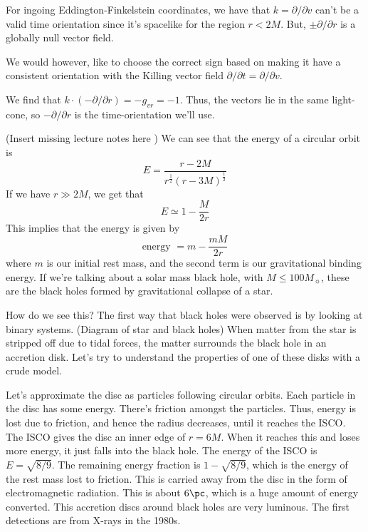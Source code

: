 \documentclass[11pt, oneside]{article}   	%
\theoremstyle{slanted}
\begin{document}
For ingoing Eddington-Finkelstein coordinates, 
we have that $ k  = \partial  / \partial v  $  	 
can't be a valid time orientation 
since it's spacelike for the 
region $ r < 2M $. 
But, $ \pm \partial  / \partial  r $ is a 
globally null vector field. 

We would however, like to 
choose the correct sign based on 
making it have a consistent orientation 
with the Killing vector field $ \partial  / \partial  t  = 
\partial   / \partial  v $. 

We find that $ k \cdot  \left(   - \partial  / \partial  r  \right)   = 
- g_{ vr }  = -1 $. Thus, 
the vectors lie 
in the same light-cone, so $  - \partial   / \partial  r $ 
is the time-orientation we'll use. 

(Insert missing lecture notes here )
We can see that the energy of a 
circular orbit is 
\[
E  = \frac{ r -  2M }{ r ^{ \frac{1}{2 }} \left( r - 3M  \right)  ^{ \frac{1}{2 } } } 
\] If we have  
$ r \gg 2M $, we get that 
\[
E \simeq 1 - \frac{M}{2 r } 
\] This implies that 
the energy is given by 
\[
\text{energy }  = m  - \frac{ m M }{ 2 r}  
\] where $ m $ is our initial rest mass, 
and the second term is our 
gravitational binding energy. 
If we're talking about a 
solar mass black hole, with $ M \leq 100 M_{ \sun} $, 
these are the black holes 
formed by gravitational collapse of a star. 

How do we see this? 
The first way that black holes 
were observed is by looking at 
binary systems. 
(Diagram of star and black holes)
When matter from the star is stripped 
off due to tidal forces, the 
matter surrounds the black hole 
in an accretion disk. 
Let's try to understand the properties of one of 
these disks with a crude model. 

Let's approximate the disc as particles following circular orbits. 
Each particle in the disc has some energy. 
There's friction 
amongst the particles. Thus, energy is lost 
due to friction, and hence the radius 
decreases, until 
it reaches the ISCO.
The ISCO gives the disc an 
inner edge of $ r = 6M $. 
When it reaches this and loses more energy, it 
just falls into the black hole. 
The energy of the ISCO is $ E  = \sqrt{ 8 / 9 }   $. 
The remaining energy fraction 
is $ 1 - \sqrt{ 8 / 9 }   $, which is the energy 
of the rest mass lost to friction. 
This is carried away from the disc 
in the form of electromagnetic radiation. 
This is about $ 6 \pc $, which is a huge amount 
of energy converted. This accretion discs 
around black holes are very luminous. 
The first detections are from X-rays in the 1980s. 
\end{document}
